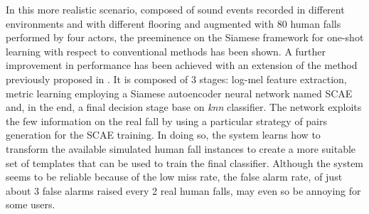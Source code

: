  In this more realistic scenario, composed of sound events recorded in different environments and with different flooring and augmented with 80 human falls performed by four actors, the preeminence on the Siamese framework for one-shot learning with respect to conventional methods has been shown. A further improvement in performance has been achieved with an extension of the method previously proposed in . It is composed of 3 stages: log-mel feature extraction, metric learning employing a Siamese autoencoder neural network named SCAE and, in the end, a final decision stage base on \textit{knn} classifier. The network exploits the few information on the real fall by using a particular strategy of pairs generation for the SCAE training. In doing so, the system learns how to transform the available simulated human fall instances to create a more suitable set of templates that can be used to train the final classifier. 
Although the system seems to be reliable because of the low miss rate, the false alarm rate, of just about 3 false alarms raised every 2 real human falls, may even so be annoying for some users. 
